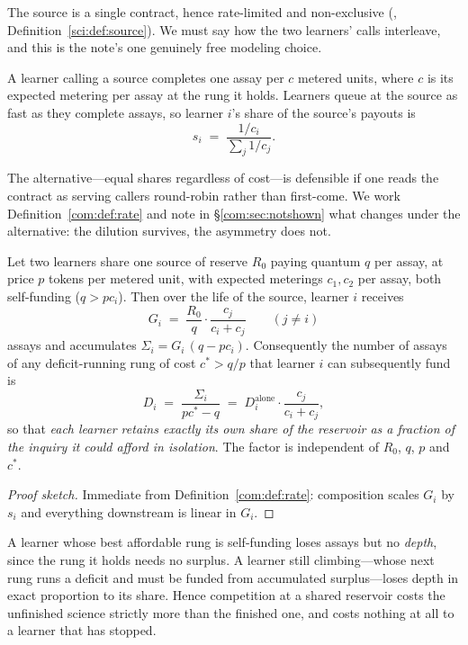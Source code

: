 The source is a single contract, hence rate-limited and non-exclusive (\chSci, Definition~\ref{sci:def:source}).
We must say how the two learners' calls interleave, and this is the note's one genuinely free
modeling choice.

\begin{definition}\label{com:def:rate}
A learner calling a source completes one assay per $c$ metered units, where $c$ is its expected
metering per assay at the rung it holds. Learners queue at the source as fast as they complete
assays, so learner $i$'s share of the source's payouts is
\[
  s_i \;=\; \frac{1/c_i}{\sum_j 1/c_j}.
\]
\end{definition}

The alternative---equal shares regardless of cost---is defensible if one reads the contract as
serving callers round-robin rather than first-come. We work Definition~\ref{com:def:rate} and note in
\S\ref{com:sec:notshown} what changes under the alternative: the dilution survives, the asymmetry
does not.

\begin{proposition}\label{com:prop:dilution}
Let two learners share one source of reserve $R_0$ paying quantum $q$ per assay, at price $p$
tokens per metered unit, with expected meterings $c_1, c_2$ per assay, both self-funding
($q > p c_i$). Then over the life of the source, learner $i$ receives
\[
  G_i \;=\; \frac{R_0}{q}\cdot \frac{c_{j}}{c_i + c_{j}} \qquad (j \neq i)
\]
assays and accumulates $\Sigma_i = G_i\,(q - p c_i)$. Consequently the number of assays of any
deficit-running rung of cost $c^\ast > q/p$ that learner $i$ can subsequently fund is
\[
  D_i \;=\; \frac{\Sigma_i}{p c^\ast - q}
  \;=\; D_i^{\text{alone}} \cdot \frac{c_{j}}{c_i + c_{j}} ,
\]
so that \emph{each learner retains exactly its own share of the reservoir as a fraction of the
inquiry it could afford in isolation}. The factor is independent of $R_0$, $q$, $p$ and $c^\ast$.
\end{proposition}

\begin{proof}[Proof sketch]
Immediate from Definition~\ref{com:def:rate}: composition scales $G_i$ by $s_i$ and everything
downstream is linear in $G_i$.
\end{proof}

\begin{corollary}\label{com:cor:regressive}
A learner whose best affordable rung is self-funding loses assays but no \emph{depth}, since the
rung it holds needs no surplus. A learner still climbing---whose next rung runs a deficit and must
be funded from accumulated surplus---loses depth in exact proportion to its share. Hence
competition at a shared reservoir costs the unfinished science strictly more than the finished
one, and costs nothing at all to a learner that has stopped.
\end{corollary}

